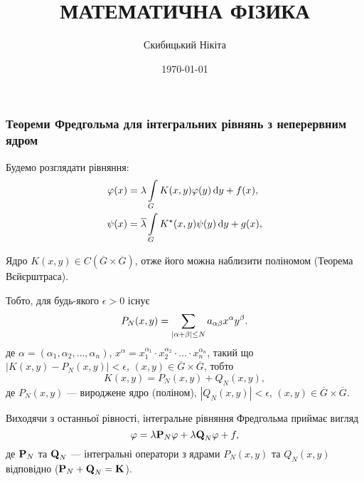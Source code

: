  

 \title{{\Huge МАТЕМАТИЧНА ФІЗИКА}}
 \author{Скибицький Нікіта}
 \date{\today}

 

 

 \tableofcontents

% 
% 

 \setcounter{section}{2}
 \setcounter{subsection}{2}
 \setcounter{subsubsection}{1}
 \setcounter{theorem}{9}
 \setcounter{equation}{28}

\subsubsection{Теореми Фредгольма для інтегральних рівнянь з неперервним ядром}

Будемо розглядати рівняння:
\begin{align}
	\phi(x) &= \lambda \Int_G K(x, y) \phi(y) \diff y + f(x), \\
	\psi(x) &= \overline \lambda \Int_G K^\star (x, y) \psi(y) \diff y + g(x),
\end{align}

Ядро $K(x, y) \in C\left(\overline G \times \overline G\right)$, отже його можна наблизити поліномом (Теорема Вєйєрштраса). \medskip

Тобто, для будь-якого $\epsilon > 0$ існує 
\begin{equation}
	P_N(x, y) = \Sum_{|\alpha + \beta| \le N} a_{\alpha\beta}x^\alpha y^\beta.
\end{equation}
де $\alpha = (\alpha_1, \alpha_2, \ldots, \alpha_n)$, $x^\alpha = x_1^{\alpha_1} \cdot x_2^{\alpha_2} \cdot \ldots \cdot x_n^{\alpha_n}$, такий що $|K(x, y) - P_N(x, y)| < \epsilon$, $(x, y) \in \overline G \times \overline G$, тобто 
\begin{equation}
	K(x, y) = P_N(x, y) + Q_N(x, y),
\end{equation}
де $P_N(x,y)$ --- вироджене ядро (поліном), $|Q_N(x, y)| < \epsilon$, $(x, y) \in \overline G \times \overline G$. \medskip

Виходячи з останньої рівності, інтегральне рівняння Фредгольма приймає вигляд 
\begin{equation}
	\phi = \lambda \bf{P}_N \phi + \lambda \bf{Q}_N \phi + f,
\end{equation}
де $\bf{P}_N$ та $\bf{Q}_N$ --- інтегральні оператори з ядрами $P_N(x, y)$ та $Q_N(x, y)$ відповідно ($\bf{P}_N + \bf{Q}_N = \bf{K}$). \medskip

